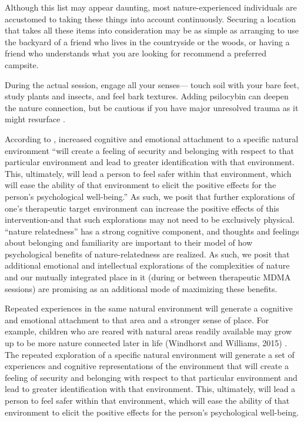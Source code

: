 \documentclass[12pt,letterpaper]{article}
\begin{document}
Although this list may appear daunting, most nature-experienced individuals are accustomed to taking these things into account continuously. Securing a location that takes all these items into consideration may be as simple as arranging to use the backyard of a friend who lives in the countryside or the woods, or having a friend who understands what you are looking for recommend a preferred campsite.

During the actual session, engage all your senses— touch soil with your bare feet, study plants and insects, and feel bark textures. Adding psilocybin can deepen the nature connection, but be cautious if you have major unresolved trauma as it might resurface \cite{forstmannPsilocybinNature}.

According to \textcite{baxterNatureRelatedness}, increased cognitive and emotional attachment to a specific natural environment “will create a feeling of security and belonging with respect to that particular environment and lead to greater identification with that environment. This, ultimately, will lead a person to feel safer within that environment, which will ease the ability of that environment to elicit the positive effects for the person's psychological well-being.” As such, we posit that further explorations of one's therapeutic target environment can increase the positive effects of this intervention-and that such explorations may not need to be exclusively physical. \textcite{baxterNatureRelatedness} “nature relatedness” has a strong cognitive component, and thoughts and feelings about belonging and familiarity are important to their model of how psychological benefits of nature-relatedness are realized. As such, we posit that additional emotional and intellectual explorations of the complexities of nature and our mutually integrated place in it (during or between therapeutic MDMA sessions) are promising as an additional mode of maximizing these benefits.

Repeated experiences in the same natural environment will generate a cognitive and emotional attachment to that area and a stronger sense of place. For example, children who are reared with natural areas readily available may grow up to be more nature connected later in life (Windhorst and Williams, 2015) \todo{}. The repeated exploration of a specific natural environment will generate a set of experiences and cognitive representations of the environment that will create a feeling of security and belonging with respect to that particular environment and lead to greater identification with that environment. This, ultimately, will lead a person to feel safer within that environment, which will ease the ability of that environment to elicit the positive effects for the person's psychological well-being.
\end{document}
